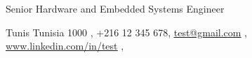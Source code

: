 \documentclass[]{cv-class}
\begin{document}
\raggedright
{}
      {Senior Hardware and Embedded Systems Engineer}
\vspace{1.15cm}
\begin{center}
  \hspace{4cm}     Tunis Tunisia 1000 ,
               +216 12 345 678, 
                 \underline{\href{mailto:test@gmail.com}{test@gmail.com}} , \\
   \hspace{4cm}  \underline{\href{https://no.linkedin.com/in/test}{www.linkedin.com/in/test}} ,     
\end{center}
\end{document}
